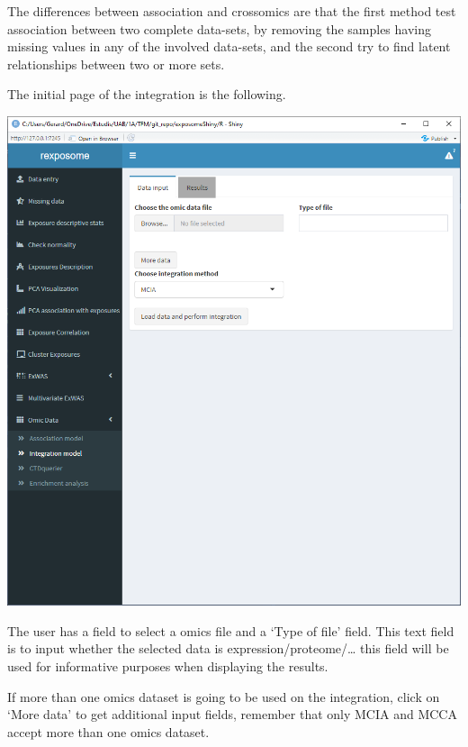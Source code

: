 \documentclass[
]{book}
\begin{document}
The differences between association and crossomics are that the first method test association between two complete data-sets, by removing the samples having missing values in any of the involved data-sets, and the second try to find latent relationships between two or more sets.

The initial page of the integration is the following.

\includegraphics{images/analysis12_1.png}

The user has a field to select a omics file and a `Type of file' field. This text field is to input whether the selected data is expression/proteome/\ldots{} this field will be used for informative purposes when displaying the results.

If more than one omics dataset is going to be used on the integration, click on `More data' to get additional input fields, remember that only MCIA and MCCA accept more than one omics dataset.
\end{document}
